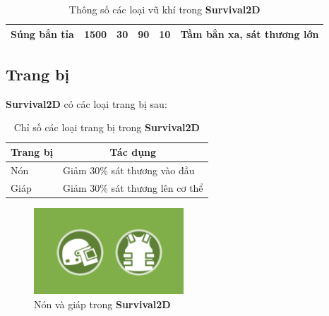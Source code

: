 \documentclass[12pt,a4paper]{article}
\begin{document}
\begin{table}[H]
\begin{tabular}{|l|c|c|c|c|l|}
Súng bắn tỉa                          & 1500                                                       & 30                                                                       & 90                                                                    & 10                                                          & Tầm bắn xa, sát thương lớn                                                                      \\ \hline
\end{tabular}
\caption{Thông số các loại vũ khí trong \textbf{Survival2D}}
\end{table}

  \subsection{Trang bị}
  \textbf{Survival2D} có các loại trang bị sau:
\begin{table}[H]
\centering
\begin{tabular}{|l|l|}
\hline
\multicolumn{1}{|c|}{\textbf{Trang bị}} & \multicolumn{1}{c|}{\textbf{Tác dụng}} \\ \hline
Nón & Giảm 30\% sát thương vào đầu \\ \hline
Giáp & Giảm 30\% sát thương lên cơ thể \\ \hline
\end{tabular}
\caption{Chỉ số các loại trang bị trong \textbf{Survival2D}}
\end{table}
  \begin{figure}[H]
      \centering
      \includegraphics[width=0.5\textwidth]{Img/game_screen_shoot/trang_bi.png}
      \caption{Nón và giáp trong \textbf{Survival2D}}
  \end{figure}
  
\end{document}
